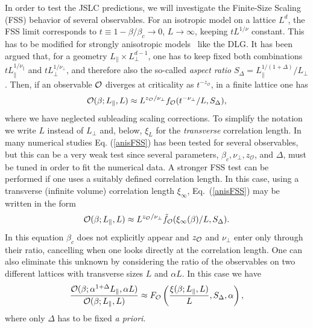 \documentclass[aps,prl,twocolumn,floatfix,amssymb]{revtex4}
\newcommand{\pe}[1]{#1_{\bot}}
\newcommand{\pa}[1]{#1_{\|}}
\begin{document}
In order to test the JSLC predictions, we will investigate the 
Finite-Size Scaling (FSS) behavior of several observables. 
For an isotropic model on a lattice $L^d$, the FSS limit corresponds to 
$t\equiv 1-\beta/\beta_{c}\to 0$, $L\to\infty$, keeping 
$tL^{1/\nu}$ constant. 
This has to be modified for strongly anisotropic models~\cite{Binder} like 
the DLG. 
It has been argued that, for a geometry $\pa{L}\times \pe{L}^{d-1}$, 
one has to keep fixed 
both combinations $t\pa{L}^{1/\pa{\nu}}$ and 
$t\pe{L}^{1/\pe{\nu}}$, and therefore also the 
so-called {\em aspect ratio} $S_{\Delta}= \pa{L}^{1/(1+\Delta)}/\pe{L}$. 
Then, if an observable $\cal O$ diverges 
at criticality as $t^{-z_{\mathcal{O}}}$, in a finite lattice one has 
\begin{equation} 
{\cal O}(\beta;\pa{L},L) \approx L^{z_{\cal O}/\pe{\nu}} 
f_{{\cal O}}(t^{-\pe{\nu}} /L,S_{\Delta}), 
\label{anisFSS} 
\end{equation} 
where we have neglected subleading scaling corrections. To simplify the notation we write $L$ instead of $\pe{L}$ and, below, $\xi_L$ for the {\em transverse} correlation length. 
In many numerical studies Eq. (\ref{anisFSS}) has been 
tested for several observables, but this can be a very 
weak test since several parameters, 
$\beta_{c}, \pe{\nu}, z_{\mathcal{O}}$, and $\Delta$, 
must be tuned in order to fit the numerical data. 
A stronger FSS test can be performed if one uses 
a suitably defined correlation length. 
In this case, using a transverse (infinite volume) correlation length 
$\xi_{\infty}$, 
Eq.~(\ref{anisFSS}) may be written in the form 
\begin{equation} 
{\cal O}(\beta;\pa{L},L) \approx 
L^{z_{\cal O}/\pe{\nu}} \tilde{f}_{{\cal O}}(\xi_{\infty}(\beta)/L,S_{\Delta}). 
\label{eq:xiform} 
\end{equation} 
In this equation $\beta_{c}$ does not explicitly appear 
and $z_{\cal{O}}$ and $\pe{\nu}$ 
enter only through their ratio, cancelling when one looks directly 
at the correlation length. One can also eliminate this unknown by considering 
the ratio of the observables 
on two different lattices with transverse sizes $L$ and $\alpha L$. In this case 
we have 
\begin{equation} 
{{\cal O}(\beta;\alpha^{1+\Delta} \pa{L}, \alpha L)\over 
 {\cal O}(\beta; \pa{L}, L)} 
\approx 
F_{\cal{O}}\left({\xi(\beta;\pa{L}, L)\over L},S_{\Delta},\alpha\right), 
\label{eq:ourform} 
\end{equation} 
where only $\Delta$ has to be fixed {\em a priori}. 
 
\end{document}
